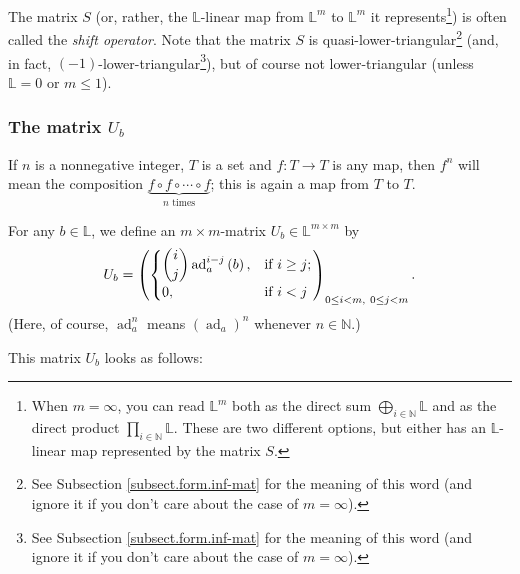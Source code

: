 \documentclass[numbers=enddot,12pt,final,onecolumn,notitlepage]{scrartcl}%
\theoremstyle{definition}
\let\prodnonlimits\prod
\renewcommand{\prod}{\prodnonlimits\limits}
\begin{document}
The matrix $S$ (or, rather, the $\mathbb{L}$-linear map from $\mathbb{L}^{m}$
to $\mathbb{L}^{m}$ it represents\footnote{When $m=\infty$, you can read
$\mathbb{L}^{m}$ both as the direct sum $\bigoplus\limits_{i\in\mathbb{N}%
}\mathbb{L}$ and as the direct product $\prod_{i\in\mathbb{N}}\mathbb{L}$.
These are two different options, but either has an $\mathbb{L}$-linear map
represented by the matrix $S$.}) is often called the \textit{shift operator}.
Note that the matrix $S$ is quasi-lower-triangular\footnote{See Subsection
\ref{subsect.form.inf-mat} for the meaning of this word (and ignore it if you
don't care about the case of $m=\infty$).} (and, in fact, $\left(  -1\right)
$-lower-triangular\footnote{See Subsection \ref{subsect.form.inf-mat} for the
meaning of this word (and ignore it if you don't care about the case of
$m=\infty$).}), but of course not lower-triangular (unless $\mathbb{L}=0$ or
$m\leq1$).

\subsubsection{The matrix $U_{b}$}

If $n$ is a nonnegative integer, $T$ is a set and $f:T\rightarrow T$ is any
map, then $f^{n}$ will mean the composition $\underbrace{f\circ f\circ
\cdots\circ f}_{n\text{ times}}$; this is again a map from $T$ to $T$.

For any $b\in\mathbb{L}$, we define an $m\times m$-matrix $U_{b}\in
\mathbb{L}^{m\times m}$ by%
\begin{equation}
U_{b}=\left(
\begin{cases}
\dbinom{i}{j}\operatorname*{ad}\nolimits_{a}^{i-j}\left(  b\right)  , &
\text{if }i\geq j;\\
0, & \text{if }i<j
\end{cases}
\right)  _{0\leq i<m,\ 0\leq j<m}. \label{eq.Ub=}%
\end{equation}
(Here, of course, $\operatorname*{ad}\nolimits_{a}^{n}$ means $\left(
\operatorname*{ad}\nolimits_{a}\right)  ^{n}$ whenever $n\in\mathbb{N}$.)

This matrix $U_{b}$ looks as follows:
\end{document}
